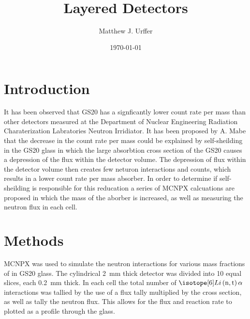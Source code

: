 \documentclass[draftcls,onecolumn]{IEEEtran}
\begin{document}
\title{Layered Detectors}
\author{Matthew J. Urffer}
\date{\today}
\maketitle


\listoftodos
\tableofcontents
\listoffigures
\listoftables
\lstlistoflistings

\section{Introduction}
It has been observed that GS20 has a signficantly lower count rate per mass  than other detectors measured at the Department of Nuclear Engineering Radiation Charaterization Labratories Neutron Irridiator.
It has been proposed by A. Mabe that the decrease in the count rate per mass  could be explained by self-sheilding in the GS20 glass in which the large absorbtion cross section of the GS20 causes a depression of the flux within the detector volume.
The depression of flux within the detector volume then creates few neturon interactions and counts, which results in a lower count rate per mass absorber.
In order to determine if self-sheilding is responsible for this reducation a series of MCNPX calcuations are proposed in which the mass of the aborber is increased, as well as measuring the neutron flux in each cell.

\section{Methods}
MCNPX was used to simulate the neutron interactions for various mass fractions of  in GS20 glass.
The cylindrical \SI{2}{\mm} thick detector was divided into 10 equal slices, each \SI{0.2}{\mm} thick.
In each cell the total number of $\iso[6]{Li}\left(\text{n},\text{t}\right)\alpha$ interactions was tallied by the use of a flux tally multiplied by the cross section, as well as tally the neutron flux.
This allows for the flux and reaction rate to plotted as a profile through the glass.
\end{document}
